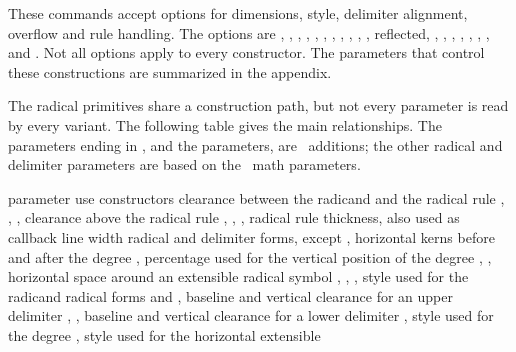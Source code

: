 These commands accept options for dimensions, style, delimiter alignment,
overflow and rule handling. The options are , ,
, , , , ,
, , , , \type
{reflected}, , , , ,
, , ,  and
. Not all options apply to every constructor. The parameters that
control these constructions are summarized in the appendix.

The radical primitives share a construction path, but not every parameter is
read by every variant. The following table gives the main relationships. The
parameters ending in , and the  parameters,
are \LUAMETATEX\ additions; the other radical and delimiter parameters are
based on the \OPENTYPE\ math parameters.

\starttabulate[|l|p|p|]
    \FL
    \BC parameter \BC use \BC constructors \NC \NR
    \TL
    \NC {}
        \NC clearance between the radicand and the radical rule
        \NC \type {\radical}, \type {\Uradical}, \type {\Uroot}, \type {\Urooted} \NC \NR
    \NC {}
        \NC clearance above the radical rule
        \NC \type {\radical}, \type {\Uradical}, \type {\Uroot}, \type {\Urooted} \NC \NR
    \NC {}
        \NC radical rule thickness, also used as callback line width
        \NC radical and delimiter forms, except \type {\Uhextensible} \NC \NR
    \NC {}, 
        \NC horizontal kerns before and after the degree
        \NC \type {\Uroot}, \type {\Urooted} \NC \NR
    \NC {}
        \NC percentage used for the vertical position of the degree
        \NC \type {\Uroot}, \type {\Urooted} \NC \NR
    \NC {}, 
        \NC horizontal space around an extensible radical symbol
        \NC \type {\radical}, \type {\Uradical}, \type {\Uroot}, \type {\Urooted} \NC \NR
    \NC {}
        \NC style used for the radicand
        \NC radical forms and \type {\Udelimited} \NC \NR
    \NC {}, 
        \NC baseline and vertical clearance for an upper delimiter
        \NC \type {\Uoverdelimiter}, \type {\Udelimiterover} \NC \NR
    \NC {}, 
        \NC baseline and vertical clearance for a lower delimiter
        \NC \type {\Uunderdelimiter}, \type {\Udelimiterunder} \NC \NR
    \NC {}
        \NC style used for the degree
        \NC \type {\Uroot}, \type {\Urooted} \NC \NR
    \NC {}
        \NC style used for the horizontal extensible
        \NC \type {\Uhextensible} \NC \NR
\stoptabulate

